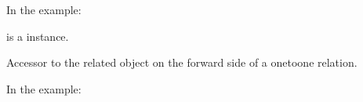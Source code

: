 \documentclass[letterpaper,10pt,spanish]{sphinxmanual}
\begin{document}
\begin{fulllineitems}
\begin{fulllineitems}
\sphinxAtStartPar
In the example:

\begin{sphinxVerbatim}[commandchars=\\\{\}]
 
       
\end{sphinxVerbatim}

\sphinxAtStartPar
{} is a  instance.

\end{fulllineitems}



\begin{fulllineitems}

\pysigstartsignatures
{}
\pysigstopsignatures
\end{fulllineitems}



\begin{fulllineitems}

\pysigstartsignatures
{}
\pysigstopsignatures
\end{fulllineitems}



\begin{fulllineitems}

\pysigstartsignatures
{}
\pysigstopsignatures
\sphinxAtStartPar
Accessor to the related object on the forward side of a one\sphinxhyphen{}to\sphinxhyphen{}one relation.

\sphinxAtStartPar
In the example:

\begin{sphinxVerbatim}[commandchars=\\\{\}]
 
       
\end{sphinxVerbatim}


\end{fulllineitems}
\end{fulllineitems}
\end{document}
